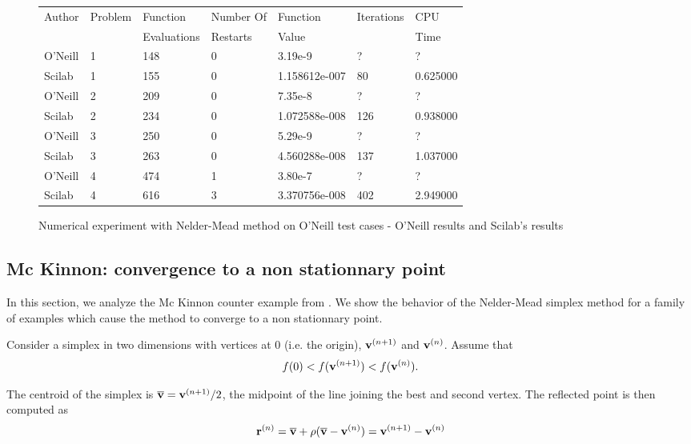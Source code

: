 \begin{figure}[htbp]
\begin{center}
\begin{tabular}{|l|l|l|l|l|l|l|}
\hline
Author & Problem & Function    & Number Of & Function  & Iterations & CPU\\
       &         & Evaluations & Restarts  & Value     &            & Time \\
\hline
O'Neill & 1 & 148 & 0 & 3.19e-9       & ?  & ? \\
Scilab  & 1 & 155 & 0 & 1.158612e-007 & 80 & 0.625000 \\
\hline
O'Neill & 2 & 209 & 0 & 7.35e-8        & ?   & ?  \\
Scilab  & 2 & 234 & 0 & 1.072588e-008  & 126 & 0.938000 \\
\hline
O'Neill & 3 & 250 & 0 & 5.29e-9       & ?   & ? \\
Scilab  & 3 & 263 & 0 & 4.560288e-008 & 137 & 1.037000 \\
\hline
O'Neill & 4 & 474 & 1 & 3.80e-7       & ?   & ? \\
Scilab  & 4 & 616 & 3 & 3.370756e-008 & 402 & 2.949000 \\
\hline
\end{tabular}
\end{center}
\caption{Numerical experiment with Nelder-Mead method on O'Neill test cases - O'Neill results and Scilab's results}
\label{fig-nm-oneill-table}
\end{figure}

\subsection{Mc Kinnon: convergence to a non stationnary point}
\label{section-mcKinnon}

In this section, we analyze the Mc Kinnon counter example 
from \cite{589109}. We show the behavior of the 
Nelder-Mead simplex method for a family of examples which cause the 
method to converge to a non stationnary point.

Consider a simplex in two dimensions with vertices at 0 (i.e. the origin),
$\mathbf{v}^{(n+1)}$ and $\mathbf{v}^{(n)}$. Assume that 
\begin{eqnarray}
\label{mckinnon-sortedfv}
f(0) < f(\mathbf{v}^{(n+1)}) < f(\mathbf{v}^{(n)}).
\end{eqnarray}

The centroid of the simplex is $\overline{\mathbf{v}} = \mathbf{v}^{(n+1)}/2$, the midpoint
of the line joining the best and second vertex. The reflected 
point is then computed as 
\begin{eqnarray}
\label{mckinnon-reflection}
\mathbf{r}^{(n)} = \overline{\mathbf{v}} + \rho ( \overline{\mathbf{v}} - \mathbf{v}^{(n)} ) 
= \mathbf{v}^{(n+1)} - \mathbf{v}^{(n)}
\end{eqnarray}

